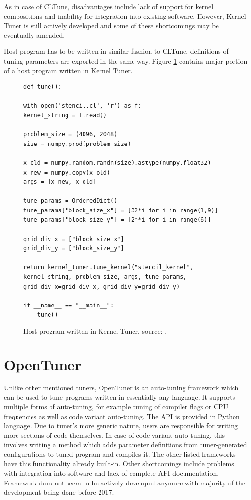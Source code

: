 \documentclass
[
    digital, %
    oneside, %
    table, %
    nolof, %
    nolot, %
    nocover %
]{fithesis3}
\begin{document}
As in case of CLTune, disadvantages include lack of support for kernel compositions and inability for integration into existing software. However,
Kernel Tuner is still actively developed and some of these shortcomings may be eventually amended.

Host program has to be written in similar fashion to CLTune, definitions of tuning parameters are exported in the same way. Figure \ref{kerneltuner-example}
contains major portion of a host program written in Kernel Tuner.
\begin{figure}[ht]
\begin{adjustwidth}{-1cm}{-1cm}
\begin{lstlisting}
def tune():

with open('stencil.cl', 'r') as f:
kernel_string = f.read()

problem_size = (4096, 2048)
size = numpy.prod(problem_size)

x_old = numpy.random.randn(size).astype(numpy.float32)
x_new = numpy.copy(x_old)
args = [x_new, x_old]

tune_params = OrderedDict()
tune_params["block_size_x"] = [32*i for i in range(1,9)]
tune_params["block_size_y"] = [2**i for i in range(6)]

grid_div_x = ["block_size_x"]
grid_div_y = ["block_size_y"]

return kernel_tuner.tune_kernel("stencil_kernel", kernel_string, problem_size, args, tune_params, grid_div_x=grid_div_x, grid_div_y=grid_div_y)

if __name__ == "__main__":
    tune()
\end{lstlisting}
\caption{Host program written in Kernel Tuner, source: \cite{kerneltuner-example}.}
\label{kerneltuner-example}
\end{adjustwidth}
\end{figure}

\section{OpenTuner}
Unlike other mentioned tuners, OpenTuner \cite{opentuner} is an auto-tuning framework which can be used to tune programs written in essentially any
language. It supports multiple forms of auto-tuning, for example tuning of compiler flags or CPU frequencies as well as code variant auto-tuning. The
API is provided in Python language. Due to tuner's more generic nature, users are responsible for writing more sections of code themselves. In case of code
variant auto-tuning, this involves writing a method which adds parameter definitions from tuner-generated configurations to tuned program and compiles
it. The other listed frameworks have this functionality already built-in. Other shortcomings include problems with integration into software and lack of
complete API documentation. Framework does not seem to be actively developed anymore with majority of the development being done before 2017.
\end{document}
